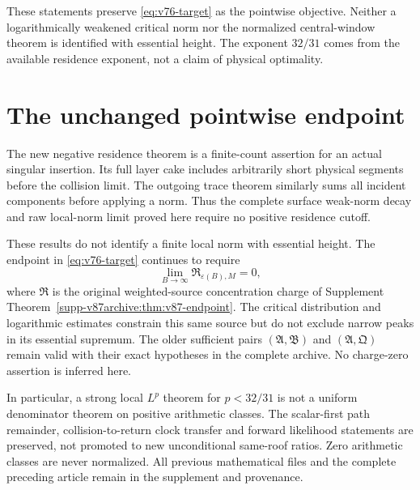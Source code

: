 \documentclass[11pt,reqno]{amsart}
\numberwithin{equation}{section}
\theoremstyle{definition}
\theoremstyle{remark}\newtheorem{remark}[theorem]{Remark}
\begin{document}
These statements preserve \eqref{eq:v76-target} as the pointwise
objective. Neither a logarithmically weakened critical norm nor the
normalized central-window theorem is identified with essential height.
The exponent $32/31$ comes from the available residence exponent,
not a claim of physical optimality.











\section{The unchanged pointwise endpoint}
The new negative residence theorem is a finite-count assertion for an
actual singular insertion. Its full layer cake includes arbitrarily
short physical segments before the collision limit. The outgoing
trace theorem similarly sums all incident components before applying
a norm. Thus the complete surface weak-norm decay and raw local-norm
limit proved here require no positive residence cutoff.

These results do not identify a finite local norm with essential
height. The endpoint in \eqref{eq:v76-target} continues to require
\[
 \lim_{B\to\infty}\mathfrak R_{\varepsilon(B),M}=0,
\]
where $\mathfrak R$ is the original weighted-source concentration
charge of Supplement Theorem~\ref{supp-v87archive:thm:v87-endpoint}.
The critical distribution and logarithmic estimates constrain this same source but do not
exclude narrow peaks in its essential supremum. The older sufficient
pairs $(\mathfrak A,\mathfrak B)$ and $(\mathfrak A,\mathfrak Q)$
remain valid with their exact hypotheses in the complete archive.
No charge-zero assertion is inferred here.

In particular, a strong local $L^p$ theorem for $p<32/31$ is not a
uniform denominator theorem on positive arithmetic classes. The
scalar-first path remainder, collision-to-return clock transfer and
forward likelihood statements are preserved, not promoted to new
unconditional same-roof ratios. Zero arithmetic classes are never
normalized. All previous mathematical files and the complete preceding
article remain in the supplement and provenance.


\end{document}

